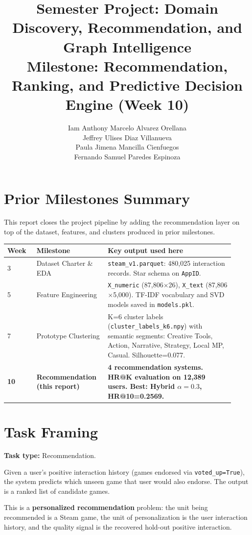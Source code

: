 \documentclass[11pt,a4paper]{article}
\title{Semester Project: Domain Discovery, Recommendation, and Graph Intelligence\\
\large Milestone: Recommendation, Ranking, and Predictive Decision Engine (Week 10)}
\author{Iam Anthony Marcelo Alvarez Orellana \\ Jeffrey Ulises Diaz Villanueva \\ Paula Jimena Mancilla Cienfuegos \\ Fernando Samuel Paredes Espinoza}
\date{}
\begin{document}
\maketitle
\onehalfspacing

\section{Prior Milestones Summary}

This report closes the project pipeline by adding the recommendation layer on top of the dataset, features, and clusters produced in prior milestones.

\begin{longtable}{p{0.12\linewidth}p{0.28\linewidth}p{0.52\linewidth}}
\toprule
\textbf{Week} & \textbf{Milestone} & \textbf{Key output used here} \\
\midrule
3 & Dataset Charter \& EDA & \texttt{steam\_v1.parquet}: 480,025 interaction records. Star schema on \texttt{AppID}. \\
5 & Feature Engineering & \texttt{X\_numeric} (87,806$\times$26), \texttt{X\_text} (87,806$\times$5,000). TF-IDF vocabulary and SVD models saved in \texttt{models.pkl}. \\
7 & Prototype Clustering & K=6 cluster labels (\texttt{cluster\_labels\_k6.npy}) with semantic segments: Creative Tools, Action, Narrative, Strategy, Local MP, Casual. Silhouette=0.077. \\
\midrule
\textbf{10} & \textbf{Recommendation (this report)} & \textbf{4 recommendation systems. HR@K evaluation on 12,389 users. Best: Hybrid $\alpha{=}0.3$, HR@10=0.2569.} \\
\bottomrule
\end{longtable}

\section{Task Framing}

\textbf{Task type:} Recommendation.

Given a user's positive interaction history (games endorsed via \texttt{voted\_up=True}), the system predicts which unseen game that user would also endorse. The output is a ranked list of candidate games.

This is a \textbf{personalized recommendation} problem: the unit being recommended is a Steam game, the unit of personalization is the user interaction history, and the quality signal is the recovered hold-out positive interaction.
\end{document}
